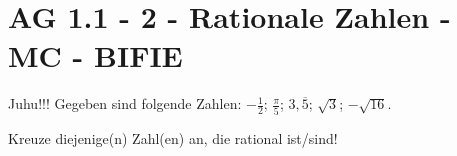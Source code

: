 \section{AG 1.1 - 2 - Rationale Zahlen - MC - BIFIE}

\begin{beispiel}[AG 1.1]{1} %
Juhu!!!
Gegeben sind folgende Zahlen: $-\frac{1}{2}$; $\frac{\pi}{5}$; $3,\overline{5}$; $\sqrt{3}$; $-\sqrt{16}$.

Kreuze diejenige(n) Zahl(en) an, die rational ist/sind!
\end{beispiel}

